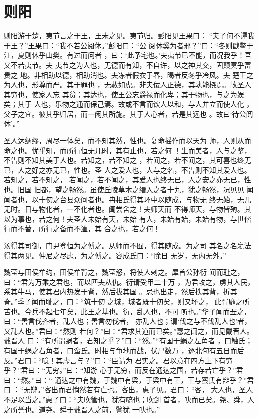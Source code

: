 \documentclass[a4paper,12pt,UTF8,twoside]{ctexbook}
\begin{document}
\section{则阳}

则阳游于楚，夷节言之于王，王未之见。夷节归。彭阳见王果曰： “夫子何不谭我于王？”王果曰：“我不若公阅休。”彭阳曰：“公 阅休奚为者邪？”曰：“冬则戳鳖于江，夏则休乎山樊。有过而问者 ，曰：‘此予宅也。’夫夷节已不能，而况我乎！吾又不若夷节。夫 夷节之为人也，无德而有知，不自许，以之神其交，固颠冥乎富贵之 地。非相助以德，相助消也。夫冻者假衣于春，暍者反冬乎冷风。夫 楚王之为人也，形尊而严。其于罪也 ，无赦如虎。非夫佞人正德，其孰能桡焉。故圣人其穷也，使家人忘 其贫；其达也，使王公忘爵禄而化卑；其于物也，与之为娱矣；其于 人也，乐物之通而保己焉。故或不言而饮人以和，与人并立而使人化 ，父子之宜。彼其乎归居，而一闲其所施。其于人心者，若是其远也 。故曰‘待公阅休’。”

圣人达绸缪，周尽一体矣，而不知其然，性也。复命摇作而以天为 师，人则从而命之也。忧乎知，而所行恒无几时，其有止也，若之何 ！生而美者，人与之鉴，不告则不知其美于人也。若知之，若不知之 ，若闻之，若不闻之，其可喜也终无已，人之好之亦无已，性也。圣 人之爱人也，人与之名，不告则不知其爱人也。若知之，若不知之， 若闻之，若不闻之，其爱人也终无已，人之安之亦无已，性也。旧国 旧都，望之畅然。虽使丘陵草木之缗入之者十九，犹之畅然，况见见 闻闻者也，以十仞之台县众间者也。冉相氏得其环中以随成，与物无 终无始，无几无时。日与物化者，一不化者也。阖尝舍之！夫师天而 不得师天，与物皆殉。其以为事也，若之何！夫圣人未始有天，未始 有人，未始有始，未始有物，与世偕行而不替，所行之备而不洫，其 合之也，若之何！

汤得其司御，门尹登恒为之傅之。从师而不囿，得其随成。为之司 其名之名嬴法得其两见。仲尼之尽虑，为之傅之。容成氏曰：“除日 无岁，无内无外。”

魏莹与田侯牟约，田侯牟背之，魏莹怒，将使人剌之。犀首公孙衍 闻而耻之，曰：“君为万乘之君也，而以匹夫从仇。衍请受甲二十万 ，为君攻之，虏其人民，系其牛马，使其君内热发于背，然后拔其国 。忌也出走，然后抶其背，折其脊。”季子闻而耻之，曰：“筑十仞 之城，城者既十仞矣，则又坏之， 此胥靡之所苦也。今兵不起七年矣，此王之基也。衍，乱人也，不可 听也。”华子闻而丑之，曰：“善言伐齐者，乱人也；善言勿伐者， 亦乱人也；谓‘伐之与不伐乱人也’者，又乱人也。”君曰：“然则 若何？”曰：“君求其道而已矣。”惠之闻之，而见戴晋人。戴晋人 曰：“有所谓蜗者，君知之乎？”曰：“然。”“有国于蜗之左角者 ，曰触氏；有国于蜗之右角者，曰蛮氏。时相与争地而战，伏尸数万 ，逐北旬有五日而后反。”君曰：“噫！其虚言与？”曰：“臣请为 君实之。君以意在四方上下有穷乎？”君曰：“无穷。”曰：“知游 心于无穷，而反在通达之国，若存若亡乎？”君曰：“然。”曰：“ 通达之中有魏，于魏中有梁，于梁中有王，王与蛮氏有辩乎？”君曰 ：“无辩。”客出而君惝然若有亡也。客出，惠子见。君曰：“客， 大人也，圣人不足以当之。”惠子曰：“夫吹管也，犹有嗃也；吹剑 首者，吷而已矣。尧、舜，人之所誉也。道尧、舜于戴晋人之前，譬犹 一吷也。”
\end{document}
